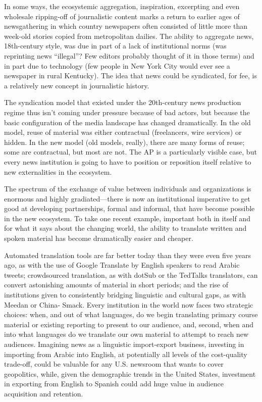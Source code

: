 In some ways, the ecosystemic aggregation, inspiration, excerpting and even
wholesale ripping-off of journalistic content marks a return to earlier ages of
newsgathering in which country newspapers often consisted of little more than
week-old stories copied from metropolitan dailies. The ability to aggregate news,
18th-century style, was due in part of a lack of institutional norms (was reprinting
news ``illegal''? Few editors probably thought of it in those terms) and in part
due to technology (few people in New York City would ever see a newspaper
in rural Kentucky). The idea that news could be syndicated, for fee, is a relatively
new concept in journalistic history.

The syndication model that existed under the 20th-century news production
regime thus isn’t coming under pressure because of bad actors, but because the
basic configuration of the media landscape has changed dramatically. In the old
model, reuse of material was either contractual (freelancers, wire services) or hidden.
In the new model (old models, really), there are many forms of reuse; some
are contractual, but most are not. The AP is a particularly visible case, but every
news institution is going to have to position or reposition itself relative to new
externalities in the ecosystem.

The spectrum of the exchange of value between individuals and organizations is
enormous and highly gradiated—there is now an institutional imperative to get
good at developing partnerships, formal and informal, that have become possible
in the new ecosystem. To take one recent example, important both in itself and
for what it says about the changing world, the ability to translate written and
spoken material has become dramatically easier and cheaper.

Automated translation tools are far better today than they were even five years
ago, as with the use of Google Translate by English speakers to read Arabic tweets;
crowdsourced translation, as with dotSub or the TedTalks translators, can convert
astonishing amounts of material in short periods; and the rise of institutions given
to consistently bridging linguistic and cultural gaps, as with Meedan or China‑
Smack. Every institution in the world now faces two strategic choices: when, and out of what languages, do we begin translating primary course material or
existing reporting to present to our audience, and, second, when and into what
languages do we translate our own material to attempt to reach new audiences.
Imagining news as a linguistic import-export business, investing in importing
from Arabic into English, at potentially all levels of the cost-quality trade-off,
could be valuable for any U.S. newsroom that wants to cover geopolitics, while,
given the demographic trends in the United States, investment in exporting from
English to Spanish could add huge value in audience acquisition and retention.

